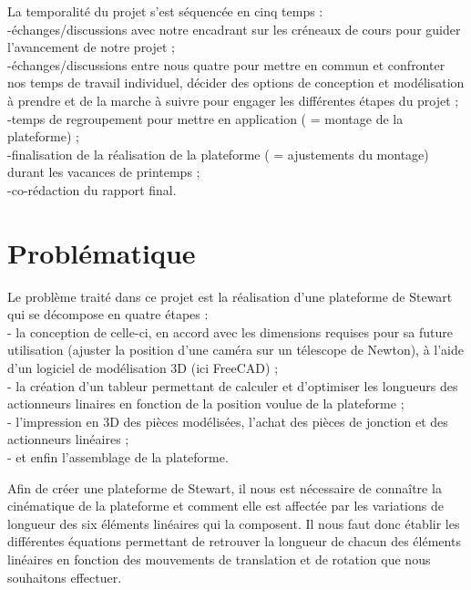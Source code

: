 \documentclass[a4paper,12pt]{article}
\begin{document}
\medskip

La temporalité du projet s'est séquencée en cinq temps : \\
-échanges/discussions avec notre encadrant sur les créneaux de cours pour guider l'avancement de notre projet ; \\
-échanges/discussions entre nous quatre pour mettre en commun et confronter nos temps de travail individuel, décider des options de conception et modélisation à prendre et de la marche à suivre pour engager les différentes étapes du projet ; \\
-temps de regroupement pour mettre en application ( = montage de la plateforme) ; \\
-finalisation de la réalisation de la plateforme ( = ajustements du montage) durant les vacances de printemps ; \\
-co-rédaction du rapport final.

\newpage

\section{Problématique}


Le problème traité dans ce projet est la réalisation d'une plateforme de Stewart qui se décompose en quatre étapes : \\
- la conception de celle-ci, en accord avec les dimensions requises pour sa future utilisation (ajuster la position d'une caméra sur un télescope de Newton), à l'aide d'un logiciel de modélisation 3D (ici FreeCAD) ; \\
- la création d'un tableur permettant de calculer et d'optimiser les longueurs des actionneurs linaires en fonction de la position voulue de la plateforme ; \\
- l'impression en 3D des pièces modélisées, l'achat des pièces de jonction et des actionneurs linéaires ; \\
- et enfin l'assemblage de la plateforme.

\medskip

Afin de créer une plateforme de Stewart, il nous est nécessaire de connaître  la cinématique de la plateforme et comment elle est affectée par les variations de longueur des six éléments linéaires qui la composent.
Il nous faut donc établir les différentes équations permettant de retrouver la longueur de chacun des éléments linéaires en fonction des mouvements de translation et de rotation que nous souhaitons effectuer. 

\medskip
\end{document}
